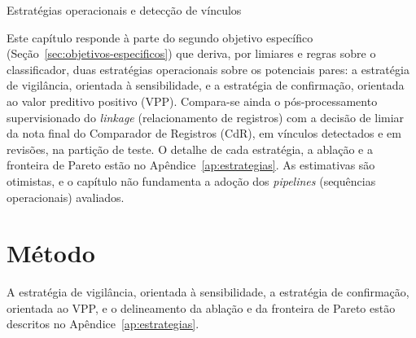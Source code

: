 \begin{chapter}{Estratégias operacionais e detecção de vínculos}\label{cap:estudo3}

Este capítulo responde à parte do segundo objetivo específico (Seção~\ref{sec:objetivos-especificos}) que deriva, por limiares e regras sobre o classificador, duas estratégias operacionais sobre os potenciais pares: a estratégia de vigilância, orientada à sensibilidade, e a estratégia de confirmação, orientada ao valor preditivo positivo (VPP). Compara-se ainda o pós-processamento supervisionado do \textit{linkage} (relacionamento de registros) com a decisão de limiar da nota final do Comparador de Registros (CdR), em vínculos detectados e em revisões, na partição de teste. O detalhe de cada estratégia, a ablação e a fronteira de Pareto estão no Apêndice~\ref{ap:estrategias}. As estimativas são otimistas, e o capítulo não fundamenta a adoção dos \textit{pipelines} (sequências operacionais) avaliados.

\section{Método}\label{sec:e3-metodo}

A estratégia de vigilância, orientada à sensibilidade, a estratégia de confirmação, orientada ao VPP, e o delineamento da ablação e da fronteira de Pareto estão descritos no Apêndice~\ref{ap:estrategias}.


\end{chapter}
